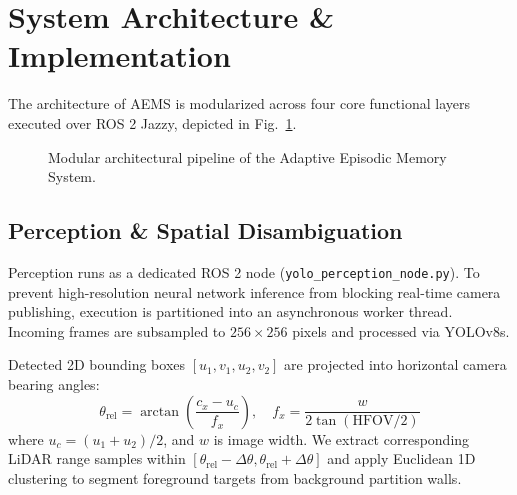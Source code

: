 \documentclass[conference]{IEEEtran}
\begin{document}
\section{System Architecture \& Implementation}

The architecture of AEMS is modularized across four core functional layers executed over ROS 2 Jazzy, depicted in Fig.~\ref{fig:arch}.

\begin{figure}[t]
\centering
{}
\caption{Modular architectural pipeline of the Adaptive Episodic Memory System.}
\label{fig:arch}
\end{figure}

\subsection{Perception \& Spatial Disambiguation}
Perception runs as a dedicated ROS 2 node (\texttt{yolo\_perception\_node.py}). To prevent high-resolution neural network inference from blocking real-time camera publishing, execution is partitioned into an asynchronous worker thread. Incoming frames are subsampled to $256 \times 256$ pixels and processed via YOLOv8s. 

Detected 2D bounding boxes $[u_1, v_1, u_2, v_2]$ are projected into horizontal camera bearing angles:
\begin{equation}
\theta_{\text{rel}} = \arctan\left(\frac{c_x - u_c}{f_x}\right), \quad f_x = \frac{w}{2 \tan(\text{HFOV}/2)}
\end{equation}
where $u_c = (u_1 + u_2)/2$, and $w$ is image width. We extract corresponding LiDAR range samples within $[\theta_{\text{rel}} - \Delta\theta, \theta_{\text{rel}} + \Delta\theta]$ and apply Euclidean 1D clustering to segment foreground targets from background partition walls.
\end{document}
